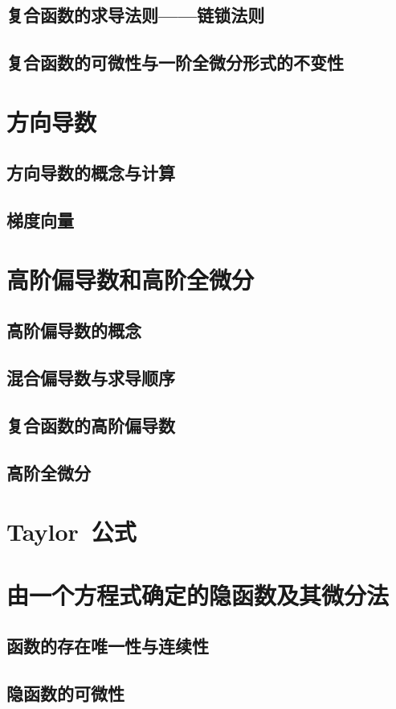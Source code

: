 \subsection{复合函数的求导法则——链锁法则}
\subsection{复合函数的可微性与一阶全微分形式的不变性}
\begin{exercise}

\end{exercise}
\section{方向导数}
\subsection{方向导数的概念与计算}
\subsection{梯度向量}
\begin{exercise}

\end{exercise}
\section{高阶偏导数和高阶全微分}
\subsection{高阶偏导数的概念}
\subsection{混合偏导数与求导顺序}
\subsection{复合函数的高阶偏导数}
\subsection{高阶全微分}
\section{Taylor~公式}
\begin{exercise}

\end{exercise}
\section{由一个方程式确定的隐函数及其微分法}
\subsection{函数的存在唯一性与连续性}
\subsection{隐函数的可微性}
\begin{exercise}

\end{exercise}
\begin{exercise*}

\end{exercise*}




\endinput
